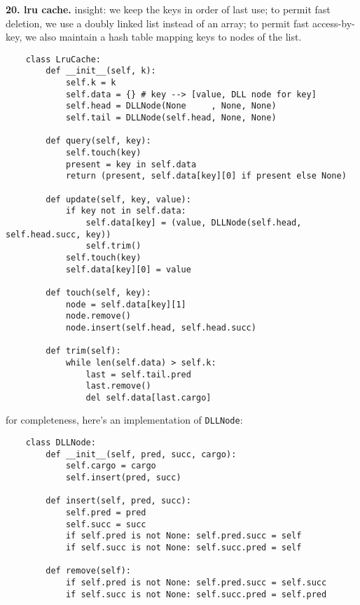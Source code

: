 \documentclass{article}
\newcommand{\cd}{\texttt}
\begin{document}
\newpage
    \par\noindent\hspace{-1cm}
    \textbf{20. lru cache.}
        insight: we keep the keys in order of last use; to permit fast
                 deletion, we use a doubly linked list instead of an array;
                 to permit fast access-by-key, we also maintain a hash
                 table mapping keys to nodes of the list.
\begin{verbatim}
    class LruCache:
        def __init__(self, k):
            self.k = k
            self.data = {} # key --> [value, DLL node for key]
            self.head = DLLNode(None     , None, None) 
            self.tail = DLLNode(self.head, None, None)

        def query(self, key): 
            self.touch(key)
            present = key in self.data
            return (present, self.data[key][0] if present else None) 

        def update(self, key, value): 
            if key not in self.data:
                self.data[key] = (value, DLLNode(self.head, self.head.succ, key)) 
                self.trim()
            self.touch(key)
            self.data[key][0] = value

        def touch(self, key):
            node = self.data[key][1] 
            node.remove()
            node.insert(self.head, self.head.succ)

        def trim(self):
            while len(self.data) > self.k:
                last = self.tail.pred
                last.remove()
                del self.data[last.cargo] 
\end{verbatim}

\vfill
\noindent for completeness, here's an implementation of \cd{DLLNode}: 
\begin{verbatim}
    class DLLNode:
        def __init__(self, pred, succ, cargo):  
            self.cargo = cargo
            self.insert(pred, succ)

        def insert(self, pred, succ):
            self.pred = pred
            self.succ = succ
            if self.pred is not None: self.pred.succ = self
            if self.succ is not None: self.succ.pred = self

        def remove(self): 
            if self.pred is not None: self.pred.succ = self.succ
            if self.succ is not None: self.succ.pred = self.pred
\end{verbatim}
\end{document}
